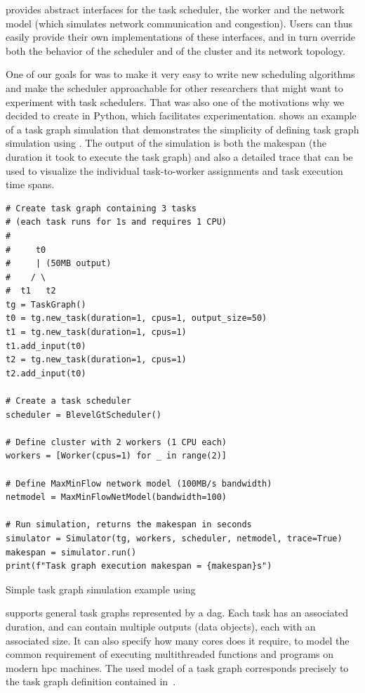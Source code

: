 \estee{} provides abstract interfaces for the task scheduler, the worker and the
network model (which simulates network communication and congestion). Users can thus easily provide
their own implementations of these interfaces, and in turn override both the behavior of the
scheduler and of the cluster and its network topology.

One of our goals for \estee{} was to make it very easy to write new scheduling
algorithms and make the scheduler approachable for other researchers that might want to experiment
with task schedulers. That was also one of the motivations why we decided to create
\estee{} in Python, which facilitates experimentation.  shows
an example of a task graph simulation that demonstrates the simplicity of defining task graph
simulation using \estee{}. The output of the simulation is both the makespan (the
duration it took to execute the task graph) and also a detailed trace that can be used to visualize
the individual task-to-worker assignments and task execution time spans.

\begin{listing}
	\begin{verbatim}
# Create task graph containing 3 tasks
# (each task runs for 1s and requires 1 CPU)
#
#     t0
#     | (50MB output)
#    / \
#  t1   t2
tg = TaskGraph()
t0 = tg.new_task(duration=1, cpus=1, output_size=50)
t1 = tg.new_task(duration=1, cpus=1)
t1.add_input(t0)
t2 = tg.new_task(duration=1, cpus=1)
t2.add_input(t0)

# Create a task scheduler
scheduler = BlevelGtScheduler()

# Define cluster with 2 workers (1 CPU each)
workers = [Worker(cpus=1) for _ in range(2)]

# Define MaxMinFlow network model (100MB/s bandwidth)
netmodel = MaxMinFlowNetModel(bandwidth=100)

# Run simulation, returns the makespan in seconds
simulator = Simulator(tg, workers, scheduler, netmodel, trace=True)
makespan = simulator.run()
print(f"Task graph execution makespan = {makespan}s")
    \end{verbatim}
	\caption{Simple task graph simulation example using \estee{}}
	\label{lst:estee-example}
\end{listing}

\estee{} supports general task graphs represented by a \gls{dag}.
Each task has an associated duration, and can contain multiple outputs (data objects), each with an
associated size. It can also specify how many cores does it require, to model the common
requirement of executing multithreaded functions and programs on modern \gls{hpc}
machines. The used model of a task graph corresponds precisely to the task graph definition
contained in~\Autoref{ch:taskgraphs}.

